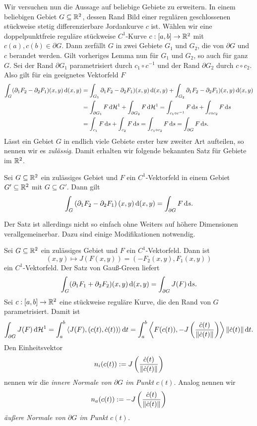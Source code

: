 \documentclass[
pdftex,
oneside,
headsepline,
11pt, 
]{scrreprt}
\begin{document}
Wir versuchen nun die Aussage auf beliebige Gebiete zu erweitern.
In einem beliebigen Gebiet $G\subseteq \mathbb{R}^2$, dessen Rand Bild einer regulären geschlossenen stückweise stetig differenzierbare Jordankurve $c$ ist. Wählen wir eine doppelpunktfreie reguläre stückweise $C^1$-Kurve $c:[a,b]\to \mathbb{R}^2$ mit $c(a),c(b)\in\partial G$. Dann zerfällt $G$ in zwei Gebiete $G_1$ und $G_2$, die von $\partial G$ und $c$ berandet werden. Gilt vorheriges Lemma nun für $G_1$ und $G_2$, so auch für ganz $G$. Sei der Rand $\partial G_1$ parametrisiert durch $c_1\circ c^{-1}$ und der Rand $\partial G_2$ durch $	c\circ c_2$.
Also gilt für ein geeignetes Vektorfeld $F$ 
\begin{align*}
\int_G(\partial_1F_2-\partial_2F_1)(x,y)\diff(x,y)&=\int_{G_1}\partial_1F_2-\partial_2F_1)(x,y)\diff(x,y)+\int_{G_2}\partial_1F_2-\partial_2F_1)(x,y)\diff(x,y)\\
&=\int_{\partial G_1}F \diff \mathcal{H}^1+\int_{\partial G_2}F \diff \mathcal{H}^1=\int_{c_1\circ c^{-1}}F\diff s+\int_{c\circ c_2}F\diff s\\
&=\int_{c_1}F\diff s + \int_{c_2} F \diff s= \int_{c_1\circ c_2}F \diff s=\int_{\partial G} F \diff s.
\end{align*}
Lässt ein Gebiet $G$ in endlich viele Gebiete erster bzw zweiter Art aufteilen, so nennen wir es \textit{zulässig}. Damit erhalten wir folgende bekannten Satz für Gebiete im $\mathbb{R}^2$.
\begin{theo}
	Sei $G\subseteq \mathbb{R}^2$ ein zulässiges Gebiet und $F$ ein $C^1$-Vektorfeld in einem Gebiet $G'\subseteq \mathbb{R}^2$ mit $G\subseteq G'$. Dann gilt \[ \int_G \left(  \partial_1 F_2-\partial_2 F_1 \right)(x,y)\mathop{}\!\mathrm{d} (x,y)=\int_{\partial G} F \mathop{}\!\mathrm{d} s. \]
\end{theo}
Der Satz ist allerdings nicht so einfach ohne Weiters auf höhere Dimensionen verallgemeinerbar. Dazu sind einige Modifikationen notwendig.
\begin{de}
		Sei $G\subseteq \mathbb{R}^2$ ein zulässiges Gebiet und $F$ ein $C^1$-Vektorfeld. Dann ist \[ (x,y)\mapsto J(F(x,y))=(-F_2(x,y),F_1(x,y)) \] ein $C^1$-Vektorfeld. Der Satz von Gauß-Green liefert \[ \int_G (\partial_1 F_1+\partial_2F_2)(x,y)\mathop{}\!\mathrm{d} (x,y)=\int_{\partial G}J(F)\mathop{}\!\mathrm{d} s. \] Sei $c:[a,b]\to \mathbb{R}^2$ eine stückweise reguläre Kurve, die den Rand von $G$ parametrisiert. Damit ist \[\int_{\partial G} J(F)\mathop{}\!\mathrm{d} \mathcal{H}^1=\int_a^b \left\langle J(F),(c(t),\dot{c}(t)) \right\rangle\mathop{}\!\mathrm{d} t=\int_a^b \left\langle F(c(t)),-J\left(  \frac{\dot{c}(t)}{\left\lVert\dot{c}(t)\right\rVert} \right) \right\rangle\left\lVert\dot{c}(t)\right\rVert\mathop{}\!\mathrm{d} t.\] Den Einheitsvektor \[ n_i(c(t)):=J\left(  \frac{\dot{c}(t)}{\left\lVert\dot{c}(t)\right\rVert} \right) \] nennen wir die \textit{innere Normale von $\partial G $ im Punkt $c(t)$}. Analog nennen wir \[ n_a(c(t)):=-J\left(  \frac{\dot{c}(t)}{\left\lVert\dot{c}(t)\right\rVert} \right) \] \textit{äußere Normale von $\partial G$ im Punkt $c(t)$.} 
\end{de}
\end{document}

